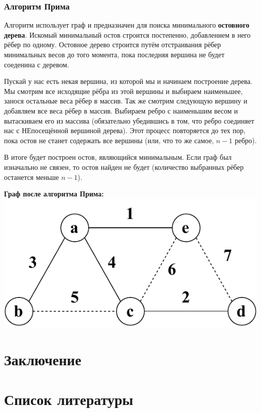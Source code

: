 \documentclass[utf8,14pt,a4paper,oneside,russian]{book}
\begin{document}
	\subsubsection{Алгоритм Прима}
	
	Алгоритм использует граф и предназначен для поиска минимального \textbf{остовного дерева}. Искомый минимальный остов строится постепенно, добавлением в него рёбер по одному. Остовное дерево строится путём отстраивания рёбер минимальных весов до того момента, пока последняя вершина не будет соеденина с деревом. 
	
	Пускай у нас есть некая вершина, из которой мы и начинаем построение дерева. Мы смотрим все исходящие рёбра из этой вершины и выбираем наименьшее, занося остальные веса рёбер в массив. Так же смотрим следующую вершину и добавляем все веса рёбер в массив. Выбираем ребро с наименьшим весом и вытаскиваем его из массива (обязательно убедившись в том, что ребро соединяет нас с НЕпосещённой вершиной дерева). Этот процесс повторяется до тех пор, пока остов не станет содержать все вершины (или, что то же самое, $n-1$ ребро).
	
	В итоге будет построен остов, являющийся минимальным. Если граф был изначально не связен, то остов найден не будет (количество выбранных рёбер останется меньше $n-1$).
	
	\begin{center}
		\textbf{Граф после алгоритма Прима:}\\
		\includegraphics[scale=0.8]{prima}\\
	\end{center}

	\newpage
	\section{Заключение}

	\newpage
	\section{Список литературы}
	
\end{document}
